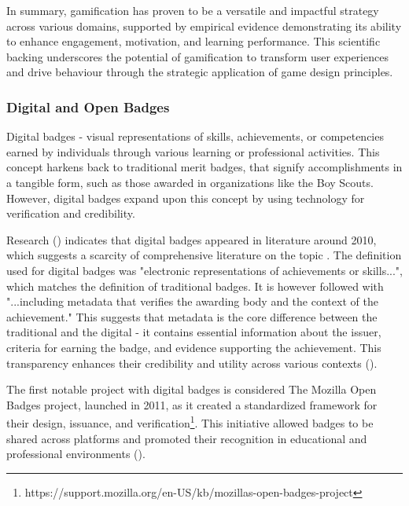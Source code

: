 In summary, gamification has proven to be a versatile and impactful strategy across various domains, supported by empirical evidence demonstrating its ability to enhance engagement, motivation, and learning performance. 
This scientific backing underscores the potential of gamification to transform user experiences and drive behaviour through the strategic application of game design principles.\\
%
\subsubsection{Digital and Open Badges}

Digital badges - visual representations of skills, achievements, or competencies earned by individuals through various learning or professional activities. 
This concept harkens back to traditional merit badges, that signify accomplishments in a tangible form, such as those awarded in organizations like the Boy Scouts. 
However, digital badges expand upon this concept by using technology for verification and credibility.

Research (\cite{GibsonBadges}) indicates that digital badges appeared in literature around 2010, which suggests a scarcity of comprehensive literature on the topic . 
The definition used for digital badges was "electronic representations of achievements or skills...", which matches the definition of traditional badges. 
It is however followed with "...including metadata that verifies the awarding body and the context of the achievement." 
This suggests that metadata is the core difference between the traditional and the digital - it contains essential information about the issuer, criteria for earning the badge, and evidence supporting the achievement. 
This transparency enhances their credibility and utility across various contexts (\cite{Bowen02012014}).

The first notable project with digital badges is considered The Mozilla Open Badges project, launched in 2011, as it created a standardized framework for their design, issuance, and verification\footnote{https://support.mozilla.org/en-US/kb/mozillas-open-badges-project}. 
This initiative allowed badges to be shared across platforms and promoted their recognition in educational and professional environments (\cite{credentialsBadges}).

